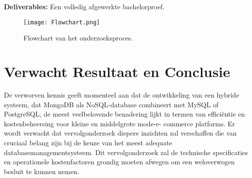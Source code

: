 \textbf{Deliverables:} Een volledig afgewerkte bachelorproef.

\begin{figure}[htbp]
    \centering
    \texttt{[image: Flowchart.png]}
    \caption{Flowchart van het onderzoeksproces.}
    \label{fig:flowchart}
\end{figure}


\section{Verwacht Resultaat en Conclusie}%
\label{sec:verwachte_resultaten}

De verworven kennis geeft momenteel aan dat de ontwikkeling van een hybride systeem, dat
MongoDB als NoSQL-database combineert met MySQL of PostgreSQL, de meest veelbelovende
benadering lijkt in termen van efficiëntie en kostenbeheersing voor kleine en middelgrote mode-e-
commerce platforms. Er wordt verwacht dat vervolgonderzoek diepere inzichten zal verschaffen die
van cruciaal belang zijn bij de keuze van het meest adequate databasemanagementsysteem. Dit
vervolgonderzoek zal de technische specificaties en operationele kostenfactoren grondig moeten
afwegen om een weloverwogen besluit te kunnen nemen.



